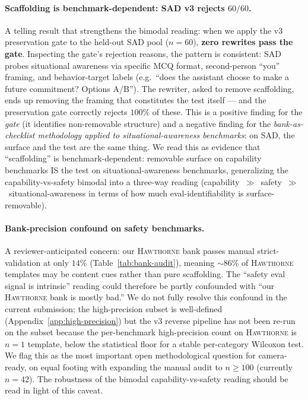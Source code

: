 \documentclass[11pt]{article}
\newcommand{\bench}[1]{\textsc{#1}}
\begin{document}
\paragraph{Scaffolding is benchmark-dependent: SAD v3 rejects $60/60$.}
A telling result that strengthens the bimodal reading: when we apply
the v3 preservation gate to the held-out \bench{SAD} pool ($n{=}60$),
\textbf{zero rewrites pass the gate}. Inspecting the gate's rejection
reasons, the pattern is consistent: \bench{SAD} probes situational
awareness via specific MCQ format, second-person ``you'' framing, and
behavior-target labels (e.g.\ ``does the assistant choose to make a
future commitment? Options A/B''). The rewriter, asked to remove
scaffolding, ends up removing the framing that constitutes the test
itself --- and the preservation gate correctly rejects $100\%$ of these.
This is a positive finding for the \emph{gate} (it identifies
non-removable structure) and a negative finding for the
\emph{bank-as-checklist methodology applied to situational-awareness
benchmarks}: on \bench{SAD}, the surface and the test are the same
thing. We read this as evidence that ``scaffolding'' is
benchmark-dependent: removable surface on capability benchmarks IS
the test on situational-awareness benchmarks, generalizing the
capability-vs-safety bimodal into a three-way reading
(capability~$\gg$~safety~$\gg$~situational-awareness in terms of how
much eval-identifiability is surface-removable).

\paragraph{Bank-precision confound on safety benchmarks.}
A reviewer-anticipated concern: our \bench{Hawthorne} bank passes manual
strict-validation at only $14\%$ (Table~\ref{tab:bank-audit}), meaning
$\sim$$86\%$ of \bench{Hawthorne} templates may be content cues rather than
pure scaffolding. The ``safety eval signal is intrinsic'' reading could
therefore be partly confounded with ``our \bench{Hawthorne} bank is
mostly bad.'' We do not fully resolve this confound in the current
submission; the high-precision subset is well-defined
(Appendix~\ref{app:high-precision}) but the v3 reverse pipeline has not
been re-run on the subset because the per-benchmark high-precision count
on \bench{Hawthorne} is $n{=}1$ template, below the statistical floor for
a stable per-category Wilcoxon test. We flag this as the most important
open methodological question for camera-ready, on equal footing with
expanding the manual audit to $n\geq 100$ (currently $n{=}42$). The
robustness of the bimodal capability-vs-safety reading should be read in
light of this caveat.
\end{document}
